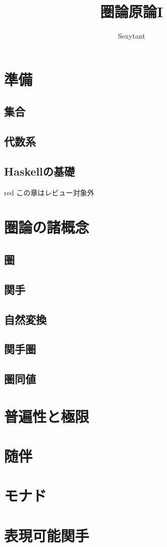 \documentclass[dvipdfmx]{jsbook}
\title{圏論原論I}
\author{Sexytant}
\theoremstyle{plain}
\begin{document}
\setcounter{tocdepth}{2}
\maketitle
\tableofcontents
\newpage
\part{準備}
\chapter{集合}


\chapter{代数系}


\chapter{Haskellの基礎}
\begin{color}{red}
この章はレビュー対象外
\end{color}


\part{圏論の諸概念}
\chapter{圏}


\chapter{関手}


\chapter{自然変換}


\chapter{関手圏}


\chapter{圏同値}


\part{普遍性と極限}

\part{随伴}

\part{モナド}

\part{表現可能関手}
\printindex
\end{document}
